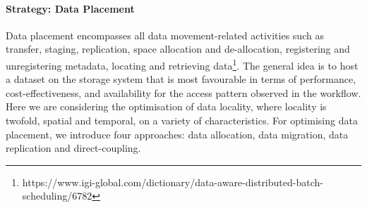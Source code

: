 \documentclass{superfri}
\begin{document}
\paragraph{Strategy: Data Placement}

Data placement encompasses all data movement-related activities such as transfer, staging, replication, space allocation and de-allocation, registering and unregistering metadata, locating and retrieving data\footnote{https://www.igi-global.com/dictionary/data-aware-distributed-batch-scheduling/6782}.
The general idea is to host a dataset on the storage system that is most favourable in terms of performance, cost-effectiveness, and availability for the access pattern observed in the workflow.
Here we are considering the optimisation of data locality, where locality is twofold, spatial and temporal, on a variety of characteristics.
For optimising data placement, we introduce four approaches: data allocation, data migration, data replication and direct-coupling.
\end{document}

